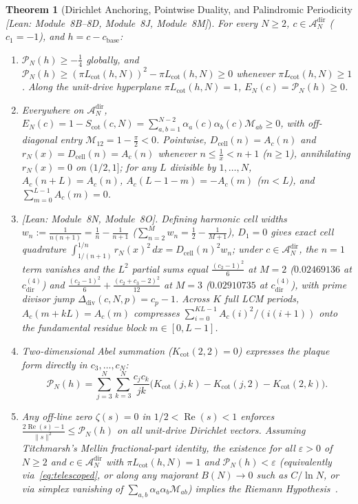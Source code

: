 \documentclass[11pt,a4paper]{article}
\newtheorem{theorem}{Theorem}[section]
\theoremstyle{definition}
\begin{document}
\begin{theorem}[Dirichlet Anchoring, Pointwise Duality, and Palindromic Periodicity \emph{[Lean: Module~8B--8D, Module~8J, Module~8M]}]\label{thm:unit_drive_tel}
For every $N \ge 2$, $c \in \mathcal{A}_N^{\mathrm{dir}}$ ($c_1 = -1$), and $h = c - c_{\mathrm{base}}$:
\begin{enumerate}[leftmargin=1.8em,itemsep=2pt]
\item $\mathcal{P}_N(h) \ge -\tfrac{1}{4}$ globally, and $\mathcal{P}_N(h) \ge (\pi L_{\mathrm{cot}}(h,N))^2 - \pi L_{\mathrm{cot}}(h,N) \ge 0$ whenever $\pi L_{\mathrm{cot}}(h,N) \ge 1$. Along the unit-drive hyperplane $\pi L_{\mathrm{cot}}(h,N) = 1$, $E_N(c) = \mathcal{P}_N(h) \ge 0$.
\item Everywhere on $\mathcal{A}_N^{\mathrm{dir}}$, $E_N(c) = 1 - S_{\mathrm{cot}}(c,N) = \sum_{a,b=1}^{N-2} \alpha_a(c)\alpha_b(c)\mathcal{M}_{ab} \ge 0$, with off-diagonal entry $\mathcal{M}_{12} = 1 - \tfrac{\pi}{2} < 0$. Pointwise, $D_{\mathrm{cell}}(n) = A_c(n)$ and $r_N(x) = D_{\mathrm{cell}}(n) = A_c(n)$ whenever $n \le \tfrac{1}{x} < n+1$ ($n \ge 1$), annihilating $r_N(x) = 0$ on $(1/2, 1]$; for any $L$ divisible by $1,\dots,N$, $A_c(n+L)=A_c(n)$, $A_c(L-1-m) = -A_c(m)$ ($m < L$), and $\sum_{m=0}^{L-1} A_c(m) = 0$.
\item \emph{[Lean: Module~8N, Module~8O].} Defining harmonic cell widths $w_n := \frac{1}{n(n+1)} = \frac{1}{n} - \frac{1}{n+1}$ ($\sum_{n=2}^M w_n = \frac{1}{2} - \frac{1}{M+1}$), $D_1 = 0$ gives exact cell quadrature $\int_{1/(n+1)}^{1/n} r_N(x)^2\,dx = D_{\mathrm{cell}}(n)^2 w_n$; under $c \in \mathcal{A}_N^{\mathrm{dir}}$, the $n=1$ term vanishes and the $L^2$ partial sums equal $\frac{(c_2-1)^2}{6}$ at $M=2$ ($0.02469136$ at $c_{\mathrm{dir}}^{(4)}$) and $\frac{(c_2-1)^2}{6} + \frac{(c_2+c_3-2)^2}{12}$ at $M=3$ ($0.02910735$ at $c_{\mathrm{dir}}^{(4)}$), with prime divisor jump $\Delta_{\mathrm{div}}(c,N,p) = c_p - 1$. Across $K$ full LCM periods, $A_c(m+kL)=A_c(m)$ compresses $\sum_{i=0}^{KL-1} A_c(i)^2/(i(i+1))$ onto the fundamental residue block $m \in [0, L-1]$.
\item Two-dimensional Abel summation ($K_{\mathrm{cot}}(2,2) = 0$) expresses the plaque form directly in $c_3,\dots,c_N$:
\begin{equation}\label{eq:telescoped}
\mathcal{P}_N(h) = \sum_{j=3}^N \sum_{k=3}^N \frac{c_j c_k}{jk}\bigl(K_{\mathrm{cot}}(j,k) - K_{\mathrm{cot}}(j,2) - K_{\mathrm{cot}}(2,k)\bigr).
\end{equation}
\item Any off-line zero $\zeta(s)=0$ in $1/2 < \operatorname{Re}(s) < 1$ enforces $\frac{2\operatorname{Re}(s)-1}{\|s\|^2} \le \mathcal{P}_N(h)$ on all unit-drive Dirichlet vectors. Assuming Titchmarsh's Mellin fractional-part identity, the existence for all $\varepsilon > 0$ of $N \ge 2$ and $c \in \mathcal{A}_N^{\mathrm{dir}}$ with $\pi L_{\mathrm{cot}}(h,N)=1$ and $\mathcal{P}_N(h) < \varepsilon$ (equivalently via~\eqref{eq:telescoped}, or along any majorant $B(N) \to 0$ such as $C/\ln N$, or via simplex vanishing of $\sum_{a,b}\alpha_a\alpha_b\mathcal{M}_{ab}$) implies the Riemann Hypothesis~\cite{Bagchi2006,Weingartner2007}.

\end{enumerate}
\end{theorem}
\end{document}
